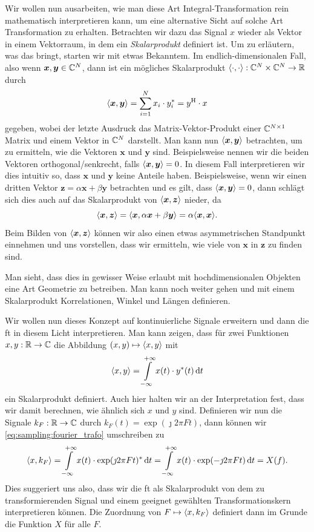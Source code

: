Wir wollen nun ausarbeiten, wie man diese Art Integral-Transformation rein mathematisch interpretieren kann, um eine alternative Sicht auf solche Art Transformation zu erhalten.
Betrachten wir dazu das Signal $x$ wieder als Vektor in einem Vektorraum, in dem ein \emph{Skalarprodukt} definiert ist.
Um zu erläutern, was das bringt, starten wir mit etwas Bekanntem.
Im endlich-dimensionalen Fall, also wenn $\bm x, \bm y \in \mathbb{C}^N$, dann ist ein mögliches Skalarprodukt ${\left\langle \cdot,\cdot \right\rangle} : \mathbb{C}^N \times \mathbb{C}^N \rightarrow \mathbb{R}$ durch
\[
 {\left\langle \bm x,\bm y \right\rangle} 
    = {\sum\limits_{i = 1}^{N}{x_i \cdot y^\ast_i}} 
    = y^{\mathrm{H}} \cdot x
\]
gegeben, wobei der letzte Ausdruck das Matrix-Vektor-Produkt einer $\mathbb{C}^{N \times 1}$ Matrix und einem Vektor in $\mathbb{C}^N$ darstellt.
Man kann nun ${\left\langle \bm x,\bm y \right\rangle}$ betrachten, um zu ermitteln, wie  die Vektoren $\bm x$ und $\bm y$ sind.
Beispielsweise nennen wir die beiden Vektoren orthogonal/senkrecht, falls ${\left\langle \bm x,\bm y \right\rangle} = 0$. 
In diesem Fall interpretieren wir dies intuitiv so, dass $\bm x$ und $\bm y$ keine  Anteile haben.
Beispielsweise, wenn wir einen dritten Vektor $\bm z = \alpha \bm x + \beta \bm y$ betrachten und es gilt, dass ${\left\langle \bm x,\bm y \right\rangle} = 0$, dann schlägt sich dies auch auf das Skalarprodukt von ${\left\langle \bm x,\bm z \right\rangle}$ nieder, da
%
\[
    {\left\langle \bm x,\bm z \right\rangle} 
        = {\left\langle \bm x,\alpha \bm x + \beta \bm y \right\rangle}
        = \alpha {\left\langle \bm x,\bm x \right\rangle}.
\]
%
Beim Bilden von ${\left\langle \bm x,\bm z \right\rangle}$ können wir also einen etwas asymmetrischen Standpunkt einnehmen und uns vorstellen, dass wir ermitteln, wie viele  von $\bm x$ in $\bm z$ zu finden sind.

Man sieht, dass dies in gewisser Weise erlaubt mit hochdimensionalen Objekten eine Art Geometrie zu betreiben.
Man kann noch weiter gehen und mit einem Skalarprodukt Korrelationen, Winkel und Längen definieren.

Wir wollen nun dieses Konzept auf kontinuierliche Signale erweitern und dann die \gls{ft} in diesem Licht interpretieren.
Man kann zeigen, dass für zwei Funktionen $x,y : \mathbb{R} \rightarrow \mathbb{C}$ die Abbildung $(x,y) \mapsto {\left\langle x,y \right\rangle}$ mit
%
\begin{equation}\label{eq:cont_scpr}
    {\left\langle x,y \right\rangle} = {\int\limits_{-\infty}^{+\infty}{
        x(t) \cdot y^\ast(t)
    }\,\mathrm{d}{t}}
\end{equation}
%
ein Skalarprodukt definiert. 
Auch hier halten wir an der Interpretation fest, dass wir damit berechnen, wie ähnlich sich $x$ und $y$ sind.
Definieren wir nun die Signale $k_F: \mathbb{R} \rightarrow \mathbb{C}$ durch $k_F(t) = \exp(\jmath 2 \pi F t)$, dann können wir \eqref{eq:sampling:fourier_trafo} umschreiben zu
\[
{\left\langle x,k_F \right\rangle} 
    = {\int\limits_{-\infty}^{+\infty}{
        x(t) \cdot \exp(\jmath 2 \pi F t)^\ast
    }\,\mathrm{d}{t}}
    = {\int\limits_{-\infty}^{+\infty}{
        x(t) \cdot \exp(-\jmath 2 \pi F t)
    }\,\mathrm{d}{t}}
    = X(f).
\]
Dies suggeriert uns also, dass wir die \gls{ft} als Skalarprodukt von dem zu transformierenden Signal und einem geeignet gewählten Transformationskern interpretieren können.
Die Zuordnung von $F \mapsto {\left\langle x,k_F \right\rangle}$ definiert dann im Grunde die Funktion $X$ für alle $F$.

